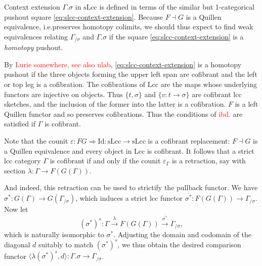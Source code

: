 \documentclass{article}
\newcommand{\todo}[1]{\textcolor{red}{#1}}
\theoremstyle{remark}
\theoremstyle{definition}
\begin{document}
Context extension $\Gamma.\sigma$ in $\mathrm{sLcc}$ is defined in terms of the similar but 1-categorical pushout square \eqref{eq:slcc-context-extension}.
Because $F \dashv G$ is a Quillen equivalence, i.e.\@ preserves homotopy colimits, we should thus expect to find weak equivalences relating $\Gamma_{/ \sigma}$ and $\Gamma.\sigma$ if the square \eqref{eq:slcc-context-extension} is a \emph{homotopy} pushout.

By \todo{Lurie somewhere, see also nlab}, \eqref{eq:slcc-context-extension} is a homotopy pushout if the three objects forming the upper left span are cofibrant and the left or top leg is a cofibration.
The cofibrations of $\mathrm{Lcc}$ are the maps whose underlying functors are injective on objects.
Thus $\{t, \sigma\}$ and $\{ v : t \rightarrow \sigma\}$ are cofibrant lcc sketches, and the inclusion of the former into the latter is a cofibration.
$F$ is a left Quillen functor and so preserves cofibrations.
Thus the conditions of \todo{ibd.} are satisfied if $\Gamma$ is cofibrant.

Note that the counit $\varepsilon : FG \Rightarrow \mathrm{Id} : \mathrm{sLcc} \rightarrow \mathrm{sLcc}$ is a cofibrant replacement: $F \dashv G$ is a Quillen equivalence and every object in $\mathrm{Lcc}$ is cofibrant.
It follows that a strict lcc category $\Gamma$ is cofibrant if and only if the counit $\varepsilon_\Gamma$ is a retraction, say with section $\lambda : \Gamma \rightarrow F(G(\Gamma))$.

And indeed, this retraction can be used to strictify the pullback functor.
We have $\sigma^* : G(\Gamma) \rightarrow G(\Gamma_{/ \sigma})$, which induces a strict lcc functor $\overline{\sigma^*} : F(G(\Gamma)) \rightarrow \Gamma_{/ \sigma}$.
Now let
\begin{equation}
  (\sigma^*)^s : \Gamma \xrightarrow{\lambda} F(G(\Gamma)) \xrightarrow{\overline{\sigma^*}} \Gamma_{/ \sigma},
\end{equation}
which is naturally isomorphic to $\sigma^*$.
Adjusting the domain and codomain of the diagonal $d$ suitably to match $(\sigma^*)^s$, we thus obtain the desired comparison functor $\langle \lambda (\sigma^*)^s, d \rangle : \Gamma.\sigma \rightarrow \Gamma_{/ \sigma}$.
\end{document}
